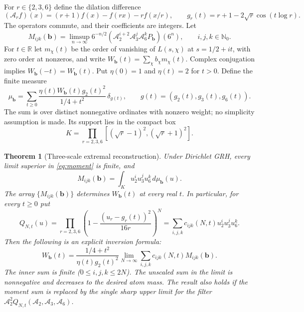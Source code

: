 \documentclass[11pt]{article}
\newtheorem{theorem}{Theorem}[section]
\theoremstyle{remark}\newtheorem{remark}[theorem]{Remark}
\newcommand{\N}{\mathbb N}\newcommand{\R}{\mathbb R}\newcommand{\C}{\mathbb C}
\newcommand{\limsupn}{\limsup_{n\to\infty}}
\newcommand{\A}{\mathcal A}
\newcommand{\bb}{\boldsymbol b}
\begin{document}
For $r\in\{2,3,6\}$ define the dilation difference
\begin{equation}\label{eq:operator}
 (\A_r f)(x)=(r+1)f(x)-f(rx)-r f(x/r),
 \qquad g_r(t)=r+1-2\sqrt r\cos(t\log r).
\end{equation}
The operators commute, and their coefficients are integers. Let
\begin{equation}\label{eq:moment}
 M_{ijk}(\bb)=\limsupn 6^{-n/2}
 (\A_2^{i+2}\A_3^j\A_6^k P_{\bb})(6^n),\qquad i,j,k\in\N_0.
\end{equation}
For $t\in\R$ let $m_\chi(t)$ be the order of vanishing of $L(s,\chi)$ at $s=1/2+it$, with zero order at nonzeros, and write $W_{\bb}(t)=\sum_\chi b_\chi m_\chi(t)$. Complex conjugation implies $W_{\bb}(-t)=W_{\bb}(t)$. Put $\eta(0)=1$ and $\eta(t)=2$ for $t>0$. Define the finite measure
\begin{equation}\label{eq:measure}
 \mu_{\bb}=\sum_{t\ge0}\frac{\eta(t)W_{\bb}(t)g_2(t)^2}{1/4+t^2}\,\delta_{g(t)},
 \qquad g(t)=(g_2(t),g_3(t),g_6(t)).
\end{equation}
The sum is over distinct nonnegative ordinates with nonzero weight; no simplicity assumption is made. Its support lies in the compact box
\[
 K=\prod_{r=2,3,6}[(\sqrt r-1)^2,(\sqrt r+1)^2].
\]

\begin{theorem}[Three-scale extremal reconstruction]\label{thm:main}
Under Dirichlet GRH, every limit superior in \eqref{eq:moment} is finite, and
\begin{equation}\label{eq:momentid}
 M_{ijk}(\bb)=\int_K u_2^i u_3^j u_6^k\,d\mu_{\bb}(u).
\end{equation}
The array $\{M_{ijk}(\bb)\}$ determines $W_{\bb}(t)$ at every real $t$. In particular, for every $t\ge0$ put
\begin{equation}\label{eq:localizer}
 Q_{N,t}(u)=\prod_{r=2,3,6}\left(1-\frac{(u_r-g_r(t))^2}{16r}\right)^N
 =\sum_{i,j,k}c_{ijk}(N,t)u_2^i u_3^j u_6^k.
\end{equation}
Then the following is an explicit inversion formula:
\begin{equation}\label{eq:recover}
 \boxed{\displaystyle
 W_{\bb}(t)=\frac{1/4+t^2}{\eta(t)g_2(t)^2}
 \lim_{N\to\infty}\sum_{i,j,k}c_{ijk}(N,t)M_{ijk}(\bb).}
\end{equation}
The inner sum is finite ($0\le i,j,k\le2N$). The unscaled sum in the limit is nonnegative and decreases to the desired atom mass. The result also holds if the moment sum is replaced by the single sharp upper limit for the filter $\A_2^2 Q_{N,t}(\A_2,\A_3,\A_6)$.
\end{theorem}
\end{document}
